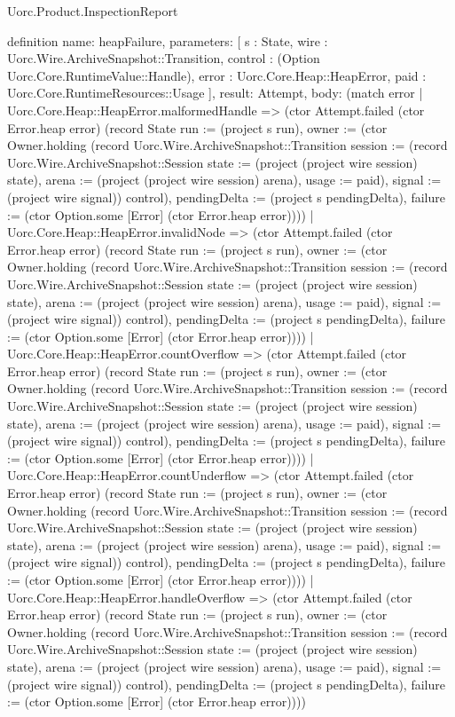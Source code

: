 \begin{lexlean}{Uorc.Product.InspectionReport}
\begin{semanticmodule}
definition{
  name: heapFailure,
  parameters: [
    s : State,
    wire : Uorc.Wire.ArchiveSnapshot::Transition,
    control : (Option Uorc.Core.RuntimeValue::Handle),
    error : Uorc.Core.Heap::HeapError,
    paid : Uorc.Core.RuntimeResources::Usage
  ],
  result: Attempt,
  body: (match error
    | Uorc.Core.Heap::HeapError.malformedHandle => (ctor Attempt.failed (ctor Error.heap error) (record State {run := (project s run), owner := (ctor Owner.holding (record Uorc.Wire.ArchiveSnapshot::Transition {session := (record Uorc.Wire.ArchiveSnapshot::Session {state := (project (project wire session) state), arena := (project (project wire session) arena), usage := paid}), signal := (project wire signal)}) control), pendingDelta := (project s pendingDelta), failure := (ctor Option.some [Error] (ctor Error.heap error))}))
    | Uorc.Core.Heap::HeapError.invalidNode => (ctor Attempt.failed (ctor Error.heap error) (record State {run := (project s run), owner := (ctor Owner.holding (record Uorc.Wire.ArchiveSnapshot::Transition {session := (record Uorc.Wire.ArchiveSnapshot::Session {state := (project (project wire session) state), arena := (project (project wire session) arena), usage := paid}), signal := (project wire signal)}) control), pendingDelta := (project s pendingDelta), failure := (ctor Option.some [Error] (ctor Error.heap error))}))
    | Uorc.Core.Heap::HeapError.countOverflow => (ctor Attempt.failed (ctor Error.heap error) (record State {run := (project s run), owner := (ctor Owner.holding (record Uorc.Wire.ArchiveSnapshot::Transition {session := (record Uorc.Wire.ArchiveSnapshot::Session {state := (project (project wire session) state), arena := (project (project wire session) arena), usage := paid}), signal := (project wire signal)}) control), pendingDelta := (project s pendingDelta), failure := (ctor Option.some [Error] (ctor Error.heap error))}))
    | Uorc.Core.Heap::HeapError.countUnderflow => (ctor Attempt.failed (ctor Error.heap error) (record State {run := (project s run), owner := (ctor Owner.holding (record Uorc.Wire.ArchiveSnapshot::Transition {session := (record Uorc.Wire.ArchiveSnapshot::Session {state := (project (project wire session) state), arena := (project (project wire session) arena), usage := paid}), signal := (project wire signal)}) control), pendingDelta := (project s pendingDelta), failure := (ctor Option.some [Error] (ctor Error.heap error))}))
    | Uorc.Core.Heap::HeapError.handleOverflow => (ctor Attempt.failed (ctor Error.heap error) (record State {run := (project s run), owner := (ctor Owner.holding (record Uorc.Wire.ArchiveSnapshot::Transition {session := (record Uorc.Wire.ArchiveSnapshot::Session {state := (project (project wire session) state), arena := (project (project wire session) arena), usage := paid}), signal := (project wire signal)}) control), pendingDelta := (project s pendingDelta), failure := (ctor Option.some [Error] (ctor Error.heap error))}))
}
\end{semanticmodule}
\end{lexlean}
